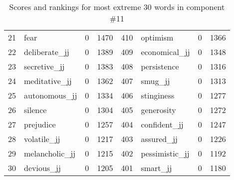 \begin{table}[tbp]
\begin{tabular}{| rlr@{.}l | rlr@{.}l |}
    21 & fear & 0 & 1470    &    410 & optimism & 0 & 1366 \\
    22 & deliberate\_jj & 0 & 1389    &    409 & economical\_jj & 0 & 1348 \\
    23 & secretive\_jj & 0 & 1383    &    408 & persistence & 0 & 1316 \\
    24 & meditative\_jj & 0 & 1362    &    407 & smug\_jj & 0 & 1313 \\
    25 & autonomous\_jj & 0 & 1334    &    406 & stinginess & 0 & 1277 \\
    26 & silence & 0 & 1304    &    405 & generosity & 0 & 1272 \\
    27 & prejudice & 0 & 1257    &    404 & confident\_jj & 0 & 1247 \\
    28 & volatile\_jj & 0 & 1217    &    403 & assured\_jj & 0 & 1226 \\
    29 & melancholic\_jj & 0 & 1215    &    402 & pessimistic\_jj & 0 & 1192 \\
    30 & devious\_jj & 0 & 1205    &    401 & smart\_jj & 0 & 1180 \\
    \hline
    \end{tabular}
    \caption{Scores and rankings for most extreme 30 words in component \#11} 
\end{table}
\clearpage
